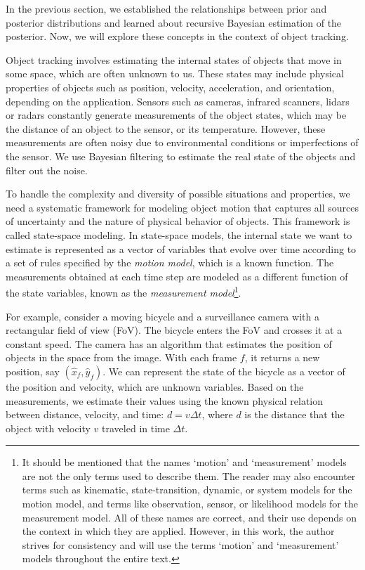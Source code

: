 In the previous section, we established the relationships between prior and 
posterior distributions and learned about recursive Bayesian estimation of the 
posterior. Now, we will explore these concepts in the context of object 
tracking.

Object tracking involves estimating the internal states of objects that move in 
some space, which are often unknown to us. These states may include physical 
properties of objects such as position, velocity, acceleration, and 
orientation, depending on the application. Sensors such as cameras, infrared 
scanners, lidars or radars constantly generate measurements of the object 
states, which may be the distance of an object to the sensor, or its 
temperature. However, these measurements are often noisy due to environmental 
conditions or imperfections of the sensor. We use Bayesian filtering to 
estimate the real state of the objects and filter out the noise.

To handle the complexity and diversity of possible situations and properties, 
we need a systematic framework for modeling object motion that captures all 
sources of uncertainty and the nature of physical behavior of objects. This 
framework is called state-space modeling. In state-space models, the internal 
state we want to estimate is represented as a vector of variables that evolve 
over time according to a set of rules specified by the \textit{motion model}, 
which is a known function. The measurements obtained at each time step are 
modeled as a different function of the state variables, known as the 
\textit{measurement model}\footnote{
    It should be mentioned that the names `motion' and `measurement' models are 
    not the only terms used to describe them. The reader may also encounter 
    terms such as kinematic, state-transition, dynamic, or system models for the 
    motion model, and terms like observation, sensor, or likelihood models for 
    the measurement model. All of these names are correct, and their use depends 
    on the context in which they are applied. However, in this work, the author 
    strives for consistency and will use the terms `motion' and `measurement' 
    models throughout the entire text.
}.

For example, consider a moving bicycle and a surveillance camera with a 
rectangular field of view (FoV). The bicycle enters the FoV and crosses it at a 
constant speed. The camera has an algorithm that estimates the position of 
objects in the space from the image. With each frame $f$, it returns a new 
position, say $(\hat x_f, \hat y_f)$. We can represent the state of the bicycle 
as a vector of the position and velocity, which are unknown variables. Based on 
the measurements, we estimate their values using the known physical relation 
between distance, velocity, and time: $d = v \Delta t$, where $d$ is the 
distance that the object with velocity $v$ traveled in time $\Delta t$.

